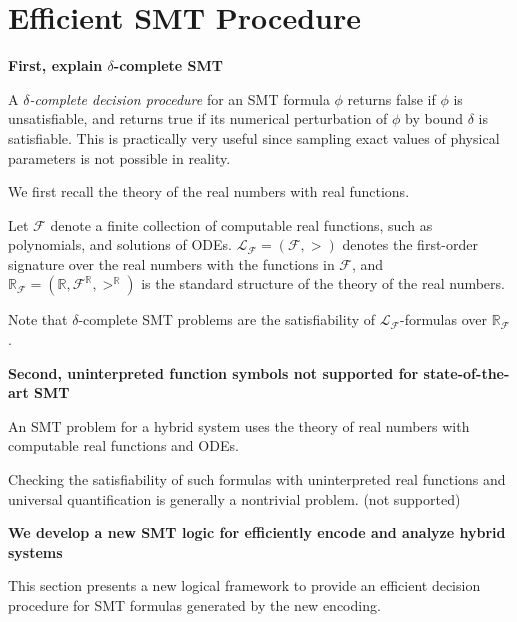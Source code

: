 

\section{Efficient SMT Procedure}
\label{sec:smt-logic}

\textbf{First, explain $\delta$-complete SMT}

A \emph{$\delta$-complete decision procedure} for an SMT formula $\phi$ returns false 
if $\phi$ is unsatisfiable, and returns true if its %
numerical perturbation of $\phi$ by bound $\delta$ is satisfiable. 
This is practically very useful since 
sampling exact values of physical parameters is not possible in reality. 


We first recall the theory of the real numbers with real functions.

\begin{definition}
Let $\mathcal{F}$ denote a finite collection of computable real functions,
such as polynomials, %
and solutions of %
ODEs.
%
$\mathcal{L}_\mathcal{F} = (\mathcal{F}, >)$ denotes the first-order signature over the real numbers
with the functions in $\mathcal{F}$,
and $\mathbb{R}_\mathcal{F} = (\mathbb{R}, \mathcal{F}^\mathbb{R}, >^\mathbb{R})$
is the standard structure of the theory of the real numbers.
\end{definition}

Note that $\delta$-complete SMT problems are the satisfiability of
$\mathcal{L}_\mathcal{F}$-formulas over $\mathbb{R}_\mathcal{F}$.

\textbf{Second, uninterpreted function symbols not supported for state-of-the-art SMT}

An SMT problem for a hybrid system uses
 the theory of  real numbers with computable real functions
and ODEs.

Checking the satisfiability of such formulas with uninterpreted real functions
and universal quantification is generally a nontrivial problem. (not supported)


\textbf{We develop a new SMT logic for efficiently encode and analyze hybrid systems}


This section presents a new logical framework
to provide an efficient decision procedure for 
SMT formulas generated by the new encoding.

